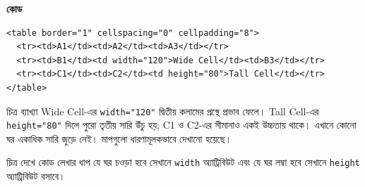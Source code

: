 \par\noindent
\begin{minipage}[t]{.50\linewidth}\vspace{0pt}\small
{\bfseries\color{chFourTeal}কোড}\par
\begin{verbatim}
<table border="1" cellspacing="0" cellpadding="8">
  <tr><td>A1</td><td>A2</td><td>A3</td></tr>
  <tr><td>B1</td><td width="120">Wide Cell</td><td>B3</td></tr>
  <tr><td>C1</td><td>C2</td><td height="80">Tall Cell</td></tr>
</table>
\end{verbatim}
\end{minipage}\hfill
\begin{minipage}[t]{.46\linewidth}\vspace{0pt}\small
\begingroup\centering
{}
\par\endgroup
\end{minipage}\par\smallskip
\par\noindent
\begin{minipage}[t]{.48\linewidth}\vspace{0pt}
\begin{keypointbox}{চিত্র ব্যাখ্যা}
Wide Cell-এর \texttt{width="120"} দ্বিতীয় কলামের প্রস্থে প্রভাব ফেলে। Tall Cell-এর \texttt{height="80"} দিলে পুরো তৃতীয় সারি উঁচু হয়; C1 ও C2-এর সীমানাও একই উচ্চতায় থাকে। এখানে কোনো ঘর একাধিক সারি জুড়ে নেই। মাপগুলো ধারণামূলকভাবে দেখানো হয়েছে।
\end{keypointbox}
\end{minipage}\hfill
\begin{minipage}[t]{.48\linewidth}\vspace{0pt}
\begin{keypointbox}{চিত্র দেখে কোড লেখার ধাপ}
যে ঘর চওড়া হবে সেখানে \texttt{width} অ্যাট্রিবিউট এবং যে ঘর লম্বা হবে সেখানে \texttt{height} অ্যাট্রিবিউট বসাবে।
\end{keypointbox}
\end{minipage}\par\smallskip




